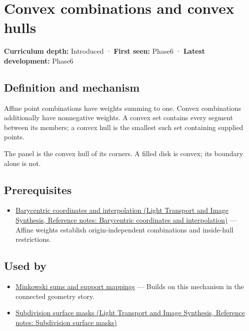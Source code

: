 \hypertarget{appendix-0026ec42c9d5}{}\label{referencestart:appendix-0026ec42c9d5}
\section{Convex combinations and convex hulls}\label{appendix-0026ec42c9d5-convex-combinations-and-convex-hulls}

\textbf{Curriculum depth:} Introduced · \textbf{First seen:} Phase6 · \textbf{Latest development:} Phase6

\begin{allmightroledefinition}

\subsection{Definition and mechanism}\label{appendix-0026ec42c9d5-definition-and-mechanism}

Affine point combinations have weights summing to one. Convex combinations additionally have nonnegative weights. A convex set contains every segment between its members; a convex hull is the smallest such set containing supplied points.

\end{allmightroledefinition}

The panel is the convex hull of its corners. A filled disk is convex; its boundary alone is not.

\subsection{Prerequisites}\label{appendix-0026ec42c9d5-prerequisites}

\begin{itemize}
\tightlist
\item
  \href{../04-Light-Transport-and-Image-Synthesis/main.pdf\#nameddest=appendix-02b9d9a81dca}{Barycentric coordinates and interpolation (Light Transport and Image Synthesis, Reference notes: Barycentric coordinates and interpolation)} --- Affine weights establish origin-independent combinations and inside-hull restrictions.
\end{itemize}

\subsection{Used by}\label{appendix-0026ec42c9d5-used-by}

\begin{itemize}
\tightlist
\item
  \hyperref[appendix-215ac7099a82]{Minkowski sums and support mappings} --- Builds on this mechanism in the connected geometry story.
\item
  \href{../04-Light-Transport-and-Image-Synthesis/main.pdf\#nameddest=appendix-0234ab7f86b1}{Subdivision surface masks (Light Transport and Image Synthesis, Reference notes: Subdivision surface masks)}
\end{itemize}

